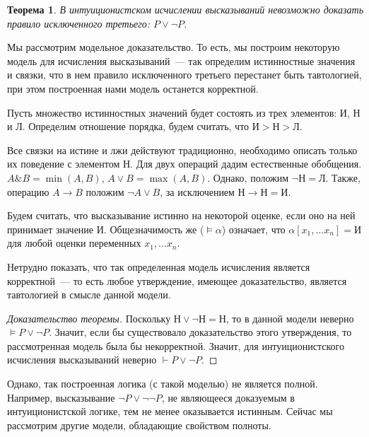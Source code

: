\documentclass[a4paper,11pt]{article}
\newtheorem{thm}{Теорема}[section]
\theoremstyle{definition}
\newcommand{\proves}{\vdash}
\newcommand{\True}{\text{И}}
\newcommand{\False}{\text{Л}}
\newcommand{\amp}{\mathbin{\&}}
\begin{document}
\begin{thm}
В интуиционистском исчислении высказываний невозможно доказать правило
исключенного третьего: $P \vee \neg P$.
\end{thm}

Мы рассмотрим модельное доказательство. То есть, мы построим некоторую модель
для исчисления высказываний~--- так определим истинностные значения и связки,
что в нем правило исключенного третьего перестанет быть тавтологией, при этом
построенная нами модель останется корректной.

Пусть множество истинностных значений будет состоять из трех элементов: $\True$,
Н и $\False$. Определим отношение порядка, будем считать, что $\True > \text{Н}
> \False$.

Все связки на истине и лжи действуют традиционно, необходимо описать только их
поведение с элементом Н. Для двух операций дадим естественные обобщения.
$A \amp B = \min(A, B)$, $A \vee B = \max(A, B)$. Однако, положим
$\neg\text{Н} = \False$. Также, операцию $A \to B$ положим $\neg A \vee B$, за
исключением $\text{Н} \to \text{Н} = \True$.

Будем считать, что высказывание истинно на некоторой оценке, если оно на ней
принимает значение $\True$. Общезначимость же ($\models \alpha$) означает, что
$\alpha[x_1, \dots x_n] = \True$ для любой оценки переменных $x_1, \dots x_n$.

Нетрудно показать, что так определенная модель исчисления является корректной~---
то есть любое утверждение, имеющее доказательство, является тавтологией в смысле
данной модели.

\begin{proof}[Доказательство теоремы]
Поскольку $\text{Н} \vee \neg\text{Н} = \text{Н}$, то в данной модели неверно
$\models P \vee \neg P$. Значит, если бы существовало доказательство этого
утверждения, то рассмотренная модель была бы некорректной. Значит, для
интуиционистского исчисления высказываний неверно $\proves P \vee \neg P$.
\end{proof}

Однако, так построенная логика (с такой моделью) не является полной. Например,
высказывание $\neg P \vee \neg\neg P$, не являющееся доказуемым в
интуиционистской логике, тем не менее оказывается истинным. Сейчас мы рассмотрим
другие модели, обладающие свойством полноты.
\end{document}
